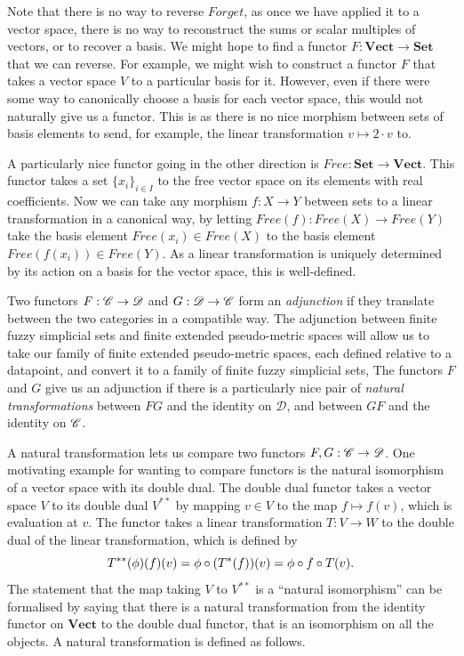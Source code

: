 \documentclass[a4paper,11pt,leqno]{article} \usepackage{amsmath}
\newcommand{\curD}{\mathscr{D}} \newcommand{\curI}{\mathscr{I}}
\theoremstyle{definition}
\begin{document}
Note that there is no way to reverse $Forget$, as once we have applied it to
a vector space, there is no way to reconstruct the sums or scalar multiples of
vectors, or to recover a basis.
We might hope to find a functor $F: \textbf{Vect}\to\textbf{Set}$ that we can
reverse.
For example, we might wish to construct a functor $F$ that takes a vector space
$V$ to a particular basis for it.
However, even if there were some way to canonically choose a basis for each
vector space, this would not naturally give us a functor.
This is as there is no nice morphism between sets of basis elements to send,
for example, the linear transformation $v\mapsto 2\cdot v$ to.

A particularly nice functor going in the other direction is $Free:
\textbf{Set}\to \textbf{Vect}$.
This functor takes a set $\{x_i\}_{i\in I}$ to the free vector space on its
elements with real coefficients.
Now we can take any morphism $f: X\to Y$ between sets to a linear
transformation in a canonical way, by letting $Free(f): Free(X)\to Free(Y)$
take the basis element $Free(x_i)\in Free(X)$ to the basis element
$Free(f(x_i))\in Free(Y)$.
As a linear transformation is uniquely determined by its action on a basis for
the vector space, this is well-defined.

Two functors $F: \curC\to\curD$ and $G: \curD\to\curC$ form an
\emph{adjunction} if they translate between the two categories in a compatible
way.
The adjunction between finite fuzzy simplicial sets and finite extended
pseudo-metric spaces will allow us to take our family of finite extended
pseudo-metric spaces, each defined relative to a datapoint, and convert it to
a family of finite fuzzy simplicial sets,
The functors $F$ and $G$ give us an adjunction if there is a particularly nice
pair of \emph{natural transformations} between $FG$ and the identity on
$\curD$, and between $GF$ and the identity on $\mathscr{C}$.

A natural transformation lets us compare two functors $F, G:
\curC\to\curD$.
One motivating example for wanting to compare functors is the natural
isomorphism of a vector space with its double dual.
The double dual functor takes a vector space $V$ to its double dual $V^{**}$ by
mapping $v\in V$ to the map $f\mapsto f(v)$, which is evaluation at $v$.
The functor takes a linear transformation $T: V\to W$ to the double dual of the
linear transformation, which is defined by
$$T^{**}(\phi)(f)(v) = \phi\circ (T^*(f))(v) = \phi\circ f\circ T(v).$$
The statement that the map taking $V$ to $V^{**}$ is a ``natural isomorphism'' can
be formalised by saying that there is a natural transformation from
the identity functor on $\textbf{Vect}$ to the double dual functor, that is an
isomorphism on all the objects.
A natural transformation is defined as follows.
\end{document}
